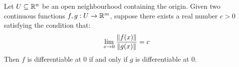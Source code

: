 \documentclass{article}
\begin{document}
\begin{lm}[type=Conjecture.]
    Let $ U \subseteq \mathbb{R}^{n} $ be an open neighbourhood containing the origin.
    Given two continuous functions $ f, g : U \rightarrow \mathbb{R}^{m} $, suppose there exists
    a real number $ c > 0 $ satisfying the condition that: \vspace{-1mm}
    \begin{equation*}
        \lim_{x \rightarrow 0}\frac{\|f(x)\|}{\|g(x)\|} = c
    \end{equation*}
    Then $ f $ is differentiable at $ 0 $ if and only if $ g $ is differentiable at $ 0 $.
\end{lm}
\end{document}
